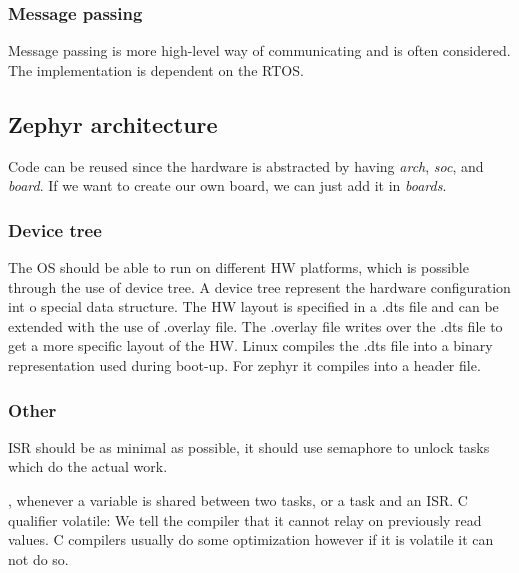 \subsubsection{Message passing}
Message passing is more high-level way of communicating and is often considered.
The implementation is dependent on the RTOS.

\subsection{Zephyr architecture}
Code can be reused since the hardware is abstracted by having \textit{arch}, \textit{soc}, and \textit{board}.
If we want to create our own board, we can just add it in \textit{boards}.

\subsubsection{Device tree}
The OS should be able to run on different HW platforms, which is possible through the use of device tree.
A device tree represent the hardware configuration int o special data structure.
The HW layout is specified in a .dts file and can be extended with the use of .overlay file.
The .overlay file writes over the .dts file to get a more specific layout of the HW.
Linux compiles the .dts file into a binary representation used during boot-up. 
For zephyr it compiles into a header file.

\subsubsection{Other}
ISR should be as minimal as possible, it should use semaphore to unlock tasks which do the actual work.

, whenever a variable is shared between two tasks, or a task and an ISR.
C qualifier volatile: We tell the compiler that it cannot relay on previously read values. 
C compilers usually do some optimization however if it is volatile it can not 
do so.

